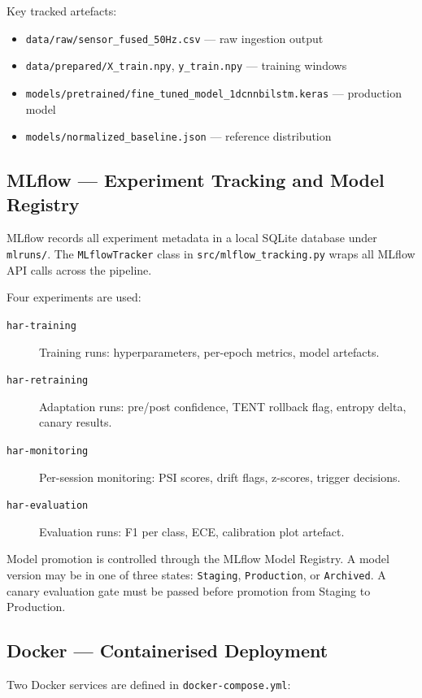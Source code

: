 Key tracked artefacts:
\begin{itemize}
  \item \texttt{data/raw/sensor\_fused\_50Hz.csv} — raw ingestion output
  \item \texttt{data/prepared/X\_train.npy}, \texttt{y\_train.npy} — training windows
  \item \texttt{models/pretrained/fine\_tuned\_model\_1dcnnbilstm.keras} — production model
  \item \texttt{models/normalized\_baseline.json} — reference distribution
\end{itemize}

\subsection{MLflow — Experiment Tracking and Model Registry}

MLflow \citep{mlflowteam2018} records all experiment metadata in a local
SQLite database under \texttt{mlruns/}.
The \texttt{MLflowTracker} class in \texttt{src/mlflow\_tracking.py} wraps
all MLflow API calls across the pipeline.

Four experiments are used:
\begin{description}
  \item[\texttt{har-training}] Training runs: hyperparameters,
        per-epoch metrics, model artefacts.
  \item[\texttt{har-retraining}] Adaptation runs: pre/post confidence,
        TENT rollback flag, entropy delta, canary results.
  \item[\texttt{har-monitoring}] Per-session monitoring: PSI scores,
        drift flags, z-scores, trigger decisions.
  \item[\texttt{har-evaluation}] Evaluation runs: F1 per class,
        ECE, calibration plot artefact.
\end{description}

Model promotion is controlled through the MLflow Model Registry.
A model version may be in one of three states: \texttt{Staging},
\texttt{Production}, or \texttt{Archived}.
A canary evaluation gate must be passed before promotion from Staging to
Production.

\subsection{Docker — Containerised Deployment}

Two Docker services are defined in \texttt{docker-compose.yml}:

